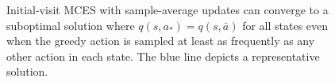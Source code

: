 \begin{figure}[htbp]
\begin{subfigure}[b]{.48\textwidth}
 \end{subfigure}%
    \caption{Initial-visit MCES with sample-average updates can converge to a suboptimal solution where $q(s, a_*) = q(s, \bar a)$ for all states
    even when the greedy action is sampled at least as frequently as any other action in each state.
    The blue line depicts a representative solution.}
    \label{fig: 3s IV ES ST}
    \vspace{-0.2cm}
\end{figure}